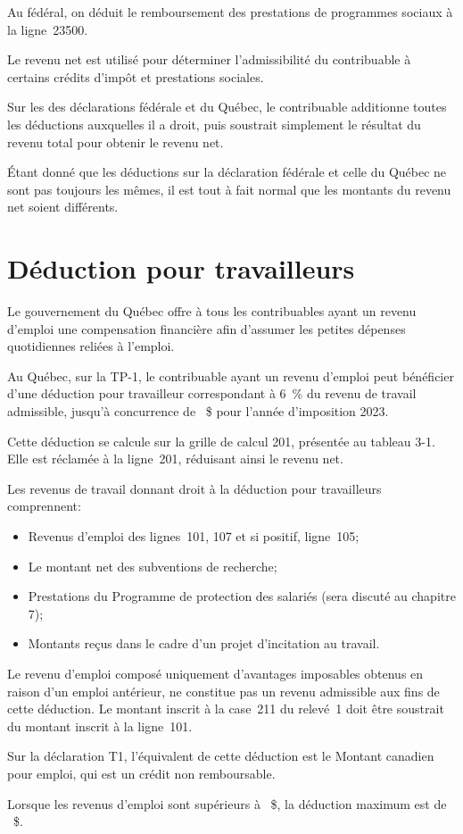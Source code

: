 Au fédéral, on déduit le remboursement des prestations de programmes sociaux à la ligne~23500.

Le revenu net est utilisé pour déterminer l'admissibilité du contribuable à certains crédits d'impôt et prestations sociales.

\begin{note}
	Sur les des déclarations fédérale et du Québec, le contribuable additionne toutes les déductions auxquelles il a droit, puis soustrait simplement le résultat du revenu total pour obtenir le revenu net.
	
	Étant donné que les déductions sur la déclaration fédérale et celle du Québec ne sont pas toujours les mêmes, il est tout à fait normal que les montants du revenu net soient différents.
\end{note}



\section{Déduction pour travailleurs}
\begin{intro}
	Le gouvernement du Québec offre à tous les contribuables ayant un revenu d'emploi une compensation financière afin d'assumer les petites dépenses quotidiennes reliées à l'emploi.
\end{intro}

Au Québec, sur la TP-1, le contribuable ayant un revenu d'emploi peut bénéficier d'une déduction pour travailleur correspondant à 6~\% du revenu de travail admissible, jusqu'à concurrence de ~\$ pour l'année d'imposition 2023. 

Cette déduction se calcule sur la grille de calcul 201, présentée au tableau 3-1. Elle est réclamée à la ligne~201, réduisant ainsi le revenu net.

Les revenus de travail donnant droit à la déduction pour travailleurs comprennent:
\begin{itemize}
	\item Revenus d'emploi des lignes~101, 107 et si positif, ligne~105;
	\item Le montant net des subventions de recherche;
	\item Prestations du Programme de protection des salariés (sera discuté au chapitre 7);
	\item Montants reçus dans le cadre d'un projet d'incitation au travail.
\end{itemize}
\begin{note}
	Le revenu d'emploi composé uniquement d'avantages imposables obtenus en raison d'un emploi antérieur, ne constitue pas un revenu admissible aux fins de cette déduction. Le montant inscrit à la case~211 du relevé~1 doit être soustrait du montant inscrit à la ligne~101.
\end{note}
Sur la déclaration T1, l'équivalent de cette déduction est le Montant canadien pour emploi, qui est un crédit non remboursable.
\begin{note}
	Lorsque les revenus d'emploi sont supérieurs à ~\$, la déduction maximum est de ~\$.
\end{note}



